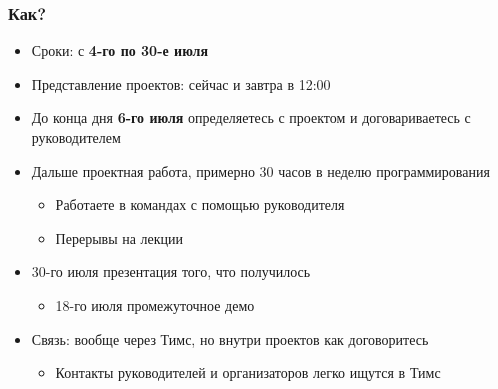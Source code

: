 \documentclass[xetex,mathserif,serif]{beamer}
\begin{document}
    \begin{frame}
        \frametitle{Как?}
        \begin{itemize}
            \item Сроки: с \textbf{4-го по 30-е июля}
            \item Представление проектов: сейчас и завтра в 12:00
            \item До конца дня \textbf{6-го июля} определяетесь с проектом и договариваетесь с руководителем
            \item Дальше проектная работа, примерно 30 часов в неделю программирования
            \begin{itemize}
                \item Работаете в командах с помощью руководителя
                \item Перерывы на лекции
            \end{itemize}
            \item 30-го июля презентация того, что получилось
            \begin{itemize}
                \item 18-го июля промежуточное демо
            \end{itemize}
            \item Связь: вообще через Тимс, но внутри проектов как договоритесь
            \begin{itemize}
                \item Контакты руководителей и организаторов легко ищутся в Тимс
            \end{itemize}
        \end{itemize}
    \end{frame}
\end{document}
